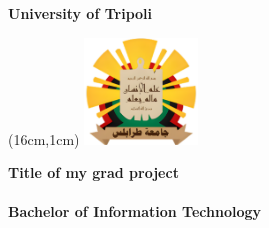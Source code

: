 \documentclass[a4paper,12pt]{book}
\begin{document}
	
	\begin{titlepage}
		\begin{flushleft}
			\fontsize{22}{22}\selectfont\textbf{University of Tripoli}\\[10pt]
		\end{flushleft}
			\hfill	
			\begin{textblock*}{3cm}(16cm,1cm)
				\includegraphics[width=3cm]{UOT_logo_transp.png}
			\end{textblock*}
			\vfill
			\begin{center}
				\fontsize{24}{24}\selectfont\textbf{Title of my grad project}\\[20pt]
				\fontsize{14}{14}\\[10pt]
				\vfill
				\fontsize{20}{20}\selectfont\textbf{Bachelor of Information Technology}\\[10pt]
				\fontsize{14}{14}\selectfont{Spring - 2025}\\
			\end{center}
	\end{titlepage}
	
\end{document}
